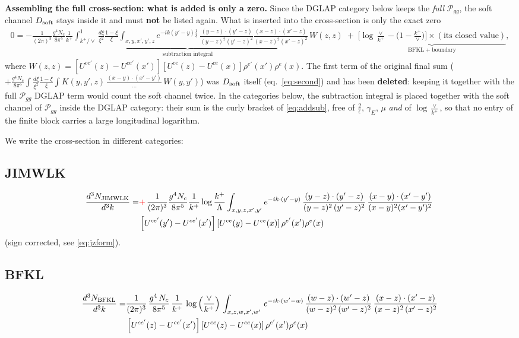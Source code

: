 \documentclass[9pt]{article}
\numberwithin{equation}{section}
\begin{document}
{\color{red}\textbf{Assembling the full cross-section: what is added is only a zero.} Since the
DGLAP category below keeps the \emph{full} $\mathcal P_{gg}$, the soft channel $D_{\rm soft}$
stays inside it and must \textbf{not} be listed again. What is inserted into the cross-section
is only the exact zero
\begin{align*}
0=-\underbrace{\frac{1}{(2\pi)^{3}}\frac{g^{4}N_{c}}{8\pi^{5}}\frac{1}{k^{+}}\int_{k^{+}/\vee}^{1}\frac{d\xi}{\xi^{2}}\frac{1-\xi}{\xi}\int_{x,y,x',y',z}e^{-ik(y'-y)\frac1\xi}\,\frac{(y-z)\cdot(y'-z)}{(y-z)^{2}(y'-z)^{2}}\frac{(x-z)\cdot(x'-z)}{(x-z)^{2}(x'-z)^{2}}\,W(z,z)}_{\text{subtraction integral}}
\;+\;\underbrace{\Big[\log\tfrac{\vee}{k^{+}}-\big(1-\tfrac{k^{+}}{\vee}\big)\Big]\times(\text{its closed value})}_{\text{BFKL}\;+\;\text{boundary}},
\end{align*}
where $W(z,z)=[U^{ce'}(z)-U^{ce'}(x')][U^{ce}(z)-U^{ce}(x)]\rho^{e'}(x')\rho^{e}(x)$. The first
term of the original final sum ($+\frac{g^{4}N_{c}}{8\pi^{5}}\int\frac{d\xi}{\xi^{2}}
\frac{1-\xi}{\xi}\int K(y,y',z)\,\frac{(x-y)\cdot(x'-y')}{\dots}\,W(y,y')$) was $D_{\rm soft}$
itself (eq.~\eqref{eq:second}) and has been \textbf{deleted}: keeping it together with the full
$\mathcal P_{gg}$ DGLAP term would count the soft channel twice. In the categories below, the
subtraction integral is placed together with the soft channel of $\mathcal P_{gg}$ inside the
DGLAP category: their sum is the curly bracket of \eqref{eq:addsub}, free of
$\frac{2}{\epsilon}$, $\gamma_{E}$, $\mu$ \emph{and} of $\log\frac{\vee}{k^{+}}$, so that no
entry of the finite block carries a large longitudinal logarithm.}

We write the cross-section in different categories:
\subsection{JIMWLK}
\begin{align}
 \frac{d^{3}N_{\rm JIMWLK}}{d^{3}k} = &   {\color{red}+}\,\frac{1}{(2\pi)^{3}}\frac{g^{4}N_{c}}{8\pi^{5}}\frac{1}{k^{+}}\log\frac{k^{+}}{\Lambda}\int_{x,y,z,x',y'}e^{-ik\cdot(y'-y)}\,\frac{(y-z)\cdot (y'-z)}{(y-z)^{2}\,(y'-z)^{2}}\,\frac{(x-y)\cdot(x'-y')}{(x-y)^{2}(x'-y')^{2}}\,\notag \\ & \left[U^{ce'}(y')-U^{ce'}(x')\right]\left[U^{ce}(y)-U^{ce}(x)\right]\rho^{e'}(x')\rho^{e}(x)
\end{align}
{\color{red}(sign corrected, see \eqref{eq:jzform}).}
\subsection{BFKL}
\begin{align}
    \frac{d^{3}N_{\rm BFKL}}{d^{3}k} = & \frac{1}{(2\pi)^{3}}\, \frac{g^{4}\,N_{c}}{8\pi^{5}}\,\frac{1}{k^{+}}\,\log{\left(\frac{\vee}{k^{+}}\right)}\,\int_{x,z,w,x',w'}\,e^{-ik\cdot (w'-w)}\,\frac{(w-z)\cdot (w'-z)}{(w-z)^{2}\,(w'-z)^{2}}\, \frac{(x-z)\cdot (x'-z)}{(x-z)^{2}\,(x'-z)^{2}}\notag \\ & \left[U^{ce'}(z)-U^{ce'}(x')\right]\left[U^{ce}(z)-U^{ce}(x)\right]\rho^{e'}(x')\rho^{e}(x)
\end{align}
\end{document}
